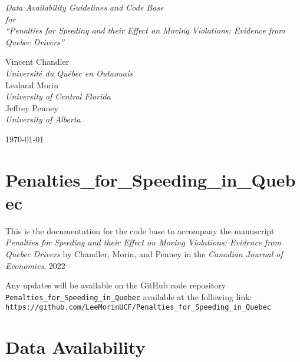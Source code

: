 \documentclass[11pt]{paper}
\begin{document}
\phantom{0}
\vspace{1.0in}


\begin{centering}

{\huge \it
Data Availability Guidelines and Code Base  \\
\bigskip
for \\
\bigskip
``Penalties for Speeding and their Effect on Moving Violations: 
Evidence from Quebec Drivers'' \\
}

\vspace{1.25in}


{\large 
Vincent Chandler \\
{\it Universit\'{e} du Qu\'{e}bec en Outaouais} \\
\medskip
Lealand Morin \\
{\it University of Central Florida} \\
\medskip
Jeffrey Penney \\
{\it University of Alberta } \\
}

\vspace{1.25in}



\today

\end{centering}


\pagebreak

\section*{Penalties\_for\_Speeding\_in\_Quebec}

This is the documentation for the code base to accompany the manuscript 
{\it Penalties for Speeding and their Effect on Moving Violations: 
Evidence from Quebec Drivers} 
by Chandler, Morin, and Penney in the \emph{Canadian Journal of Economics}, 2022

Any updates will be available on the GitHub code repository 
 \texttt{Penalties\_for\_Speeding\_in\_Quebec}
available at the following link: \\

 \texttt{https://github.com/LeeMorinUCF/Penalties\_for\_Speeding\_in\_Quebec} \\


\section*{Data Availability}
\end{document}
